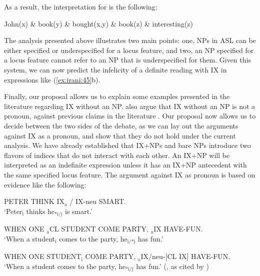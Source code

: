 \documentclass[output=paper,
modfonts
]{langscibook}
\begin{document}
As a result, the interpretation for  is the following:

\begin{exe}

\ex John(x) \& book(y) \& bought(x,y) \& book(z) \& interesting(z) 

\end{exe}

The analysis presented above illustrates two main points: one, NPs in ASL can be either specified or underspecified for a locus feature, and two, an NP specified for a locus feature cannot refer to an NP that is underspecified for them. Given this system, we can now predict the infelicity of a definite reading with IX in expressions like (\ref{ex:irani:45}b). 

Finally, our proposal allows us to explain some examples presented in the literature regarding IX without an NP. \citet{KoulidobrovaLilloMartin2016} also argue that IX without an NP is not a pronoun, against previous claims in the literature \citep{Kuhn2015}. Our proposal now allows us to decide between the two sides of the debate, as we can lay out the arguments against IX as a pronoun, and show that they do not hold under the current analysis. We have already established that IX+NPs and bare NPs introduce two flavors of indices that do not interact with each other. An IX+NP will be interpreted as an indefinite expression unless it has an IX+NP antecedent with the same specified locus feature. The argument against IX as pronoun is based on evidence like the following: 

\begin{exe} 
	\ex \label{ex:irani:66} PETER THINK IX$_\text{a}$ / IX-neu SMART. \\
	`Peter$_\text{i}$ thinks he$_\text{*i/j}$ is smart.' \citep[18]{KoulidobrovaLilloMartin2016}
\end{exe} 

\begin{exe} 
	\ex \label{ex:irani:67}
	\begin{xlist} 
		\ex \label{ex:irani:67a} WHEN ONE $_\text{a}$CL STUDENT COME PARTY, $_\text{a}$IX HAVE-FUN.\\
		`When a student$_\text{i}$ comes to the party, he$_\text{i/*j}$ has fun.’  
		
		\ex  WHEN ONE STUDENT$_\text{i}$ COME PARTY, $_\text{a}$IX/neu-[CL IX] HAVE-FUN.\\
		`When a student comes to the party, he$_\text{*i/j}$ has fun.’ (\citealt{Schlenker2010}, as cited by \citealt{KoulidobrovaLilloMartin2016})
	\end{xlist}     
\end{exe} 
\end{document}
